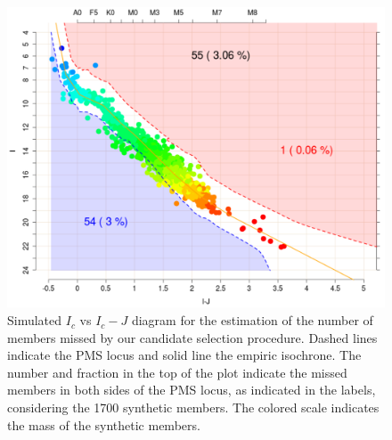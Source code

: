 \documentclass[12pt]{article}
\begin{document}
\begin{figure}[ht!]
	\begin{minipage}{0.60\textwidth}
		\includegraphics[width=1.00\textwidth]{f_5.pdf}
	\end{minipage} \hfill
	\begin{minipage}{0.35\textwidth}
		\caption[Simulated $I_c$ vs $I_c-J$ diagram to estimate missed members in our sample.]{Simulated $I_c$ vs $I_c-J$ diagram for the estimation of the number of members missed by our candidate selection procedure. Dashed lines indicate the PMS locus and solid line the empiric isochrone. The number and fraction in the top of the plot indicate the missed members in both sides of the PMS locus, as indicated in the labels, considering the 1700 synthetic members. The colored scale indicates the mass of the synthetic members.
		\label{fig_IMF:syntheticIvsIJ}}
	\end{minipage}
\end{figure}
\end{document}
